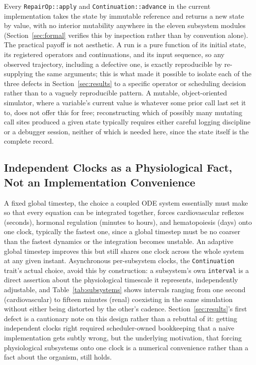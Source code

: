 \documentclass[11pt]{article}
\begin{document}
Every \texttt{RepairOp::apply} and \texttt{Continuation::advance} in the current implementation takes the state by immutable reference and returns a new state by value, with no interior mutability anywhere in the eleven subsystem modules (Section~\ref{sec:formal} verifies this by inspection rather than by convention alone). The practical payoff is not aesthetic. A run is a pure function of its initial state, its registered operators and continuations, and its input sequence, so any observed trajectory, including a defective one, is exactly reproducible by re-supplying the same arguments; this is what made it possible to isolate each of the three defects in Section~\ref{sec:results} to a specific operator or scheduling decision rather than to a vaguely reproducible pattern. A mutable, object-oriented simulator, where a variable's current value is whatever some prior call last set it to, does not offer this for free; reconstructing which of possibly many mutating call sites produced a given state typically requires either careful logging discipline or a debugger session, neither of which is needed here, since the state itself is the complete record.

\subsection{Independent Clocks as a Physiological Fact, Not an Implementation Convenience}

A fixed global timestep, the choice a coupled ODE system essentially must make so that every equation can be integrated together, forces cardiovascular reflexes (seconds), hormonal regulation (minutes to hours), and hematopoiesis (days) onto one clock, typically the fastest one, since a global timestep must be no coarser than the fastest dynamics or the integration becomes unstable. An adaptive global timestep improves this but still shares one clock across the whole system at any given instant. Asynchronous per-subsystem clocks, the \texttt{Continuation} trait's actual choice, avoid this by construction: a subsystem's own \texttt{interval} is a direct assertion about the physiological timescale it represents, independently adjustable, and Table~\ref{tab:subsystems} shows intervals ranging from one second (cardiovascular) to fifteen minutes (renal) coexisting in the same simulation without either being distorted by the other's cadence. Section~\ref{sec:results}'s first defect is a cautionary note on this design rather than a rebuttal of it: getting independent clocks right required scheduler-owned bookkeeping that a naive implementation gets subtly wrong, but the underlying motivation, that forcing physiological subsystems onto one clock is a numerical convenience rather than a fact about the organism, still holds.
\end{document}
